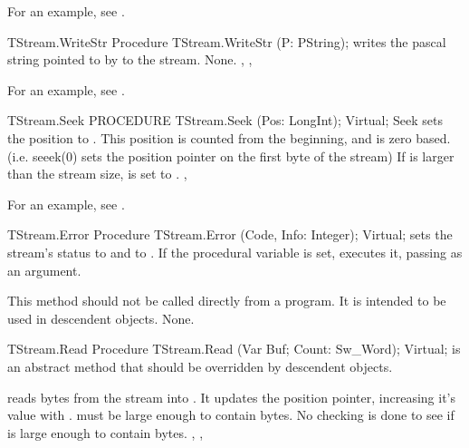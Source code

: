 For an example, see .

\begin{procedure}{TStream.WriteStr}
\Declaration
Procedure TStream.WriteStr (P: PString);
\Description
{} writes the pascal string pointed to by  to the stream.
\Errors
None.
\SeeAlso
{}, ,
\end{procedure}

For an example, see .

\begin{procedure}{TStream.Seek}
\Declaration      
PROCEDURE TStream.Seek (Pos: LongInt); Virtual;
\Description
Seek sets the position to . This position is counted
from the beginning, and is zero based. (i.e. seeek(0) sets the position
pointer on the first byte of the stream)
\Errors
If  is larger than the stream size,  is set to
.
\SeeAlso
{}, 
\end{procedure}


For an example, see .

\begin{procedure}{TStream.Error}
\Declaration
Procedure TStream.Error (Code, Info: Integer); Virtual;
\Description
{} sets the stream's status to  and 
to . If the  procedural variable is set,
 executes it, passing  as an argument.

This method should not be called directly from a program. It is intended to
be used in descendent objects.
\Errors
None.
\SeeAlso
\end{procedure}

\begin{procedure}{TStream.Read}
\Declaration
Procedure TStream.Read (Var Buf; Count: Sw\_Word); Virtual;
\Description
{} is an abstract method that should be overridden by descendent
objects.

 reads  bytes from the stream into .
It updates the position pointer, increasing it's value with . 
 must be large enough to contain  bytes.
\Errors
No checking is done to see if  is large enough to contain
 bytes. 
\SeeAlso
{}, ,
\end{procedure}

